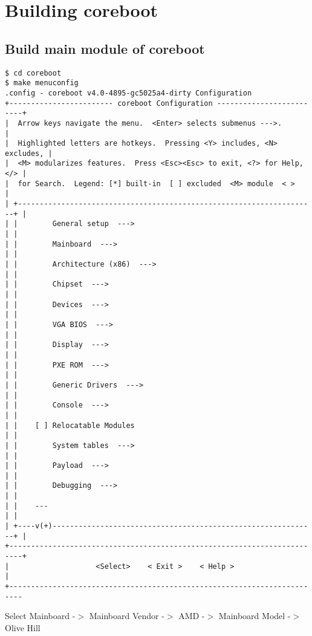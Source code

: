 \documentclass[titlepage,12pt]{article}
\begin{document}
%
%

\section{Building coreboot}
\subsection{Build main module of coreboot}
{ \small
\begin{verbatim}
$ cd coreboot
$ make menuconfig
.config - coreboot v4.0-4895-gc5025a4-dirty Configuration
+------------------------ coreboot Configuration -------------------------+
|  Arrow keys navigate the menu.  <Enter> selects submenus --->.          |
|  Highlighted letters are hotkeys.  Pressing <Y> includes, <N> excludes, |
|  <M> modularizes features.  Press <Esc><Esc> to exit, <?> for Help, </> |
|  for Search.  Legend: [*] built-in  [ ] excluded  <M> module  < >       |
| +---------------------------------------------------------------------+ |
| |        General setup  --->                                          | |
| |        Mainboard  --->                                              | |
| |        Architecture (x86)  --->                                     | |
| |        Chipset  --->                                                | |
| |        Devices  --->                                                | |
| |        VGA BIOS  --->                                               | |
| |        Display  --->                                                | |
| |        PXE ROM  --->                                                | |
| |        Generic Drivers  --->                                        | |
| |        Console  --->                                                | |
| |    [ ] Relocatable Modules                                          | |
| |        System tables  --->                                          | |
| |        Payload  --->                                                | |
| |        Debugging  --->                                              | |
| |    ---                                                              | |
| +----v(+)-------------------------------------------------------------+ |
+-------------------------------------------------------------------------+
|                    <Select>    < Exit >    < Help >                     |
+-------------------------------------------------------------------------
\end{verbatim}
}
Select Mainboard -$>$ Mainboard Vendor -$>$ AMD
                 -$>$ Mainboard Model  -$>$ Olive Hill
\end{document}
